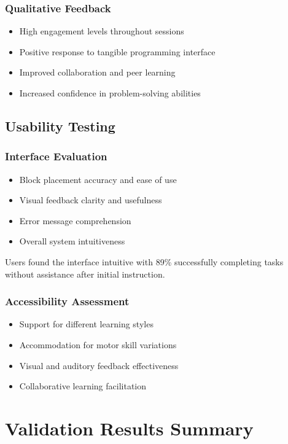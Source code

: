 \subsubsection{Qualitative Feedback}
\begin{itemize}
    \item High engagement levels throughout sessions
    \item Positive response to tangible programming interface
    \item Improved collaboration and peer learning
    \item Increased confidence in problem-solving abilities
\end{itemize}

\subsection{Usability Testing}

\subsubsection{Interface Evaluation}
\begin{itemize}
    \item Block placement accuracy and ease of use
    \item Visual feedback clarity and usefulness
    \item Error message comprehension
    \item Overall system intuitiveness
\end{itemize}

Users found the interface intuitive with 89\% successfully completing tasks without assistance after initial instruction.

\subsubsection{Accessibility Assessment}
\begin{itemize}
    \item Support for different learning styles
    \item Accommodation for motor skill variations
    \item Visual and auditory feedback effectiveness
    \item Collaborative learning facilitation
\end{itemize}

\section{Validation Results Summary}

